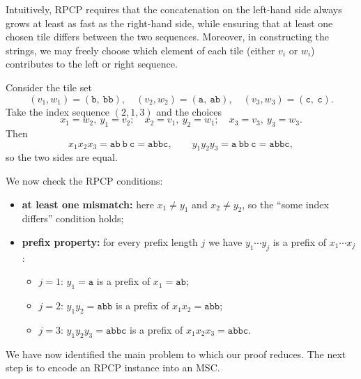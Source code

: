 Intuitively, RPCP requires that the concatenation on the left-hand side always 
grows at least as fast as the right-hand side, while ensuring that at least one 
chosen tile differs between the two sequences. Moreover, in constructing the 
strings, we may freely choose which element of each tile (either $v_i$ or $w_i$) 
contributes to the left or right sequence.

\bigskip

\begin{example}\label{exmp:rpcp}
Consider the tile set
\[
(v_1,w_1)=(\texttt{b},\ \texttt{bb}),\quad
(v_2,w_2)=(\texttt{a},\ \texttt{ab}),\quad
(v_3,w_3)=(\texttt{c},\ \texttt{c}).
\]
Take the index sequence $(2,1,3)$ and the choices
\[
x_1 = w_2,\ y_1 = v_2;\quad
x_2 = v_1,\ y_2 = w_1;\quad
x_3 = v_3,\ y_3 = w_3.
\]
Then
\[
x_1 x_2 x_3 = \texttt{ab}\ \texttt{b}\ \texttt{c} = \texttt{abbc},
\qquad
y_1 y_2 y_3 = \texttt{a}\ \texttt{bb}\ \texttt{c} = \texttt{abbc},
\]
so the two sides are equal.

We now check the RPCP conditions:
\begin{itemize}
  \item \textbf{at least one mismatch:} here $x_1\neq y_1$ and
        $x_2\neq y_2$, so the ``some index differs'' condition holds;
  \item \textbf{prefix property:} for every prefix length $j$ we have
        $y_{1}\cdots y_{j}$ is a prefix of $x_{1}\cdots x_{j}$:
        \begin{itemize}
          \item $j=1$: $y_1=\texttt{a}$ is a prefix of $x_1=\texttt{ab}$;
          \item $j=2$: $y_1y_2=\texttt{abb}$ is a prefix of $x_1x_2=\texttt{abb}$;
          \item $j=3$: $y_1y_2y_3=\texttt{abbc}$ is a prefix of $x_1x_2x_3=\texttt{abbc}$.
        \end{itemize}
\end{itemize}
\end{example}

\bigskip

We have now identified the main problem to which our proof reduces.  
The next step is to encode an RPCP instance into an MSC.

\bigskip

